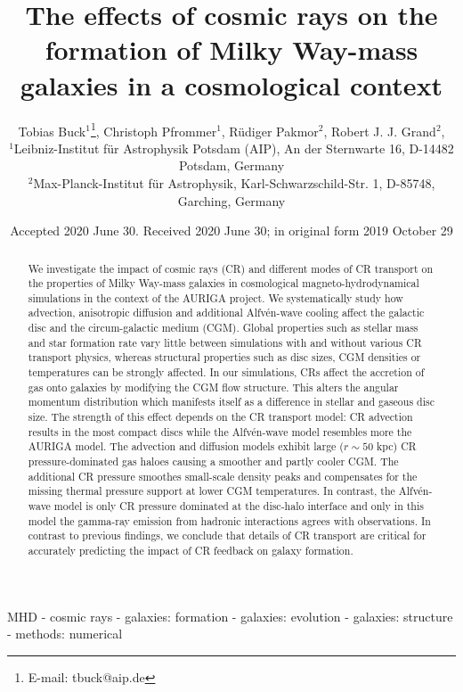 \documentclass[useAMS,usenatbib]{mnras}
\title[Cosmic rays in cosmological simulations]
{The effects of cosmic rays on the formation of Milky Way-mass galaxies in a cosmological context}
\author[T. Buck \etal] {Tobias Buck$^{1}$\thanks{E-mail:
    tbuck@aip.de},
    Christoph Pfrommer$^{1}$,
    R\"udiger Pakmor$^{2}$,
    Robert J. J. Grand$^{2}$,
    \newauthor{\& Volker Springel$^{2}$}\\
$^1$Leibniz-Institut f\"ur Astrophysik Potsdam (AIP), An der Sternwarte 16, D-14482 Potsdam, Germany\\
$^2$Max-Planck-Institut f\"ur Astrophysik, Karl-Schwarzschild-Str. 1, D-85748, Garching, Germany
}
\begin{document}
\date{Accepted 2020 June 30. Received 2020 June 30; in original form 2019 October 29}

\pagerange{\pageref{firstpage}--\pageref{lastpage}} 

\maketitle

\label{firstpage}




\begin{abstract}
  We investigate the impact of cosmic rays (CR) and different modes of CR
  transport on the properties of Milky Way-mass galaxies in cosmological
  magneto-hydrodynamical simulations in the context of the AURIGA project. We
  systematically study how advection, anisotropic diffusion and additional
  Alfv\'en-wave cooling affect the galactic disc and the circum-galactic medium
  (CGM). Global properties such as stellar mass and star formation rate vary
  little between simulations with and without various CR transport physics,
  whereas structural properties such as disc sizes, CGM densities or
  temperatures can be strongly affected. In our simulations, CRs affect the
  accretion of gas onto galaxies by modifying the CGM flow structure. This
  alters the angular momentum distribution which manifests itself as a
  difference in stellar and gaseous disc size. The strength of this effect
  depends on the CR transport model: CR advection results in the most compact
  discs while the Alfv\'en-wave model resembles more the AURIGA model. The
  advection and diffusion models exhibit large ($r\sim50$ kpc) CR
  pressure-dominated gas haloes causing a smoother and partly cooler CGM. The
  additional CR pressure smoothes small-scale density peaks and compensates for
  the missing thermal pressure support at lower CGM temperatures. In contrast,
  the Alfv\'en-wave model is only CR pressure dominated at the disc-halo
  interface and only in this model the gamma-ray emission from hadronic
  interactions agrees with observations. In contrast to previous findings, we
  conclude that details of CR transport are critical for accurately predicting
  the impact of CR feedback on galaxy formation.
\end{abstract}

\noindent
\begin{keywords}

MHD - cosmic rays - galaxies: formation - galaxies: evolution - galaxies: structure - methods: numerical

 \end{keywords}
\end{document}
